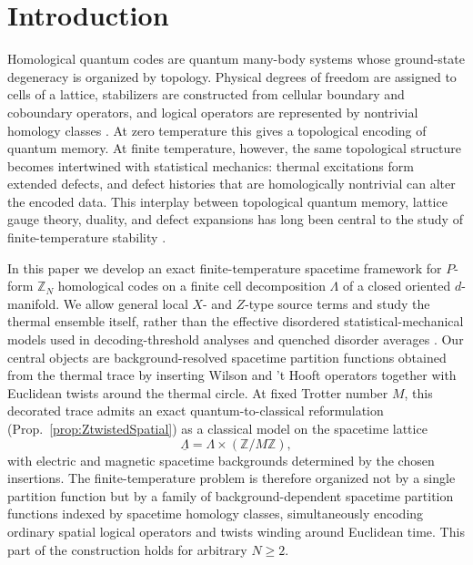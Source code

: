 \section{Introduction}
\label{sec:introduction}

Homological quantum codes are quantum many-body systems whose ground-state
degeneracy is organized by topology. Physical degrees of freedom are assigned to
cells of a lattice, stabilizers are constructed from cellular boundary and
coboundary operators, and logical operators are represented by nontrivial
homology classes
\cite{Kitaev:1997wr,freedman2002,DennisKitaevLandahlPreskill2002,
	BombinMartinDelgado2007,Terhal:2013vbm}. At zero temperature this gives a
topological encoding of quantum memory. At finite temperature, however, the same
topological structure becomes intertwined with statistical mechanics: thermal
excitations form extended defects, and defect histories that are homologically
nontrivial can alter the encoded data. This interplay between topological
quantum memory, lattice gauge theory, duality, and defect expansions has long
been central to the study of finite-temperature stability
\cite{Wegner:1971app,Savit1980,DennisKitaevLandahlPreskill2002,
	WangHarringtonPreskill2003,Nussinov:2007srh,Castelnovo:2007byc,
	Castelnovo:2008jyy,Bravyi:2008rvr,Bravyi:2009ert,Hastings:2011iig,
	Landon-Cardinal:2012nio,Hastings:2013jxa,Brown:2014idi,Alicki:2008nak,Chesi:2009woi}.

In this paper we develop an exact finite-temperature spacetime framework for
\(P\)-form \(\mathbb Z_N\) homological codes on a finite cell decomposition
\(\Lambda\) of a closed oriented \(d\)-manifold. We allow general local \(X\)- and \(Z\)-type source terms and study the thermal
ensemble itself, rather than the effective disordered statistical-mechanical
models used in decoding-threshold analyses and quenched disorder averages
\cite{DennisKitaevLandahlPreskill2002,WangHarringtonPreskill2003,Nishimori1981}. Our central objects are
background-resolved spacetime partition functions obtained from the thermal
trace by inserting Wilson and 't Hooft operators together with Euclidean twists
around the thermal circle. At fixed Trotter number \(M\), this decorated trace
admits an exact quantum-to-classical reformulation
(Prop.~\ref{prop:ZtwistedSpatial}) as a classical model on the spacetime lattice
\begin{equation}
	\underline\Lambda=\Lambda\times (\mathbb Z/M\mathbb Z),
\end{equation}
with electric and magnetic spacetime backgrounds determined by the chosen
insertions. The finite-temperature problem is therefore organized not by a
single partition function but by a family of background-dependent spacetime
partition functions indexed by spacetime homology classes, simultaneously
encoding ordinary spatial logical operators and twists winding around Euclidean
time. This part of the construction holds for arbitrary \(N\ge 2\).

